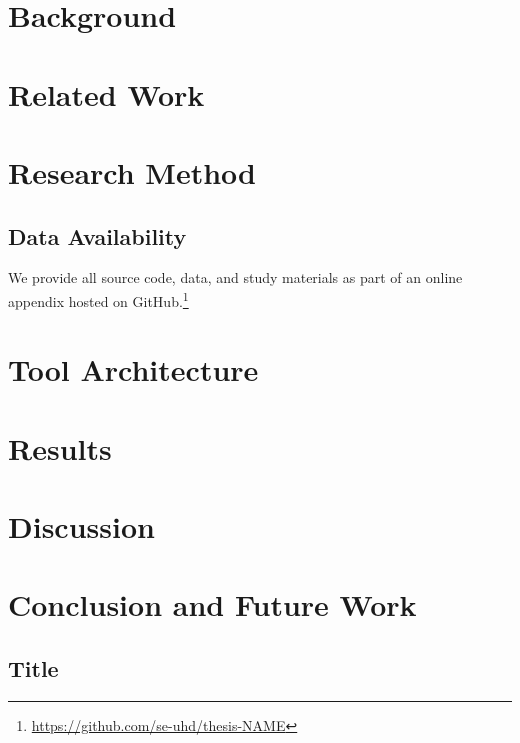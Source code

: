 \documentclass[
    pdftex,
    final,
    11pt,
    a4paper,
    parskip=false, %
    twoside, %
    footheight=0mm, %
    footinclude=false,
    toc=bibliography, %
    toc=listof %
]{scrbook} %
\begin{document}
\chapter{Background}
\label{ch:background}

\lipsum[1-12]

\chapter{Related Work}
\label{ch:related-work}

\lipsum[1-4]

\chapter{Research Method}
\label{ch:research-method}

\lipsum[1-4]

\section{Data Availability}
\label{sec:data-availability}

We provide all source code, data, and study materials as part of an online appendix hosted on GitHub.\footnote{\url{https://github.com/se-uhd/thesis-NAME}}


\chapter{Tool Architecture}
\label{ch:tool-architecture}

\lipsum[1-4]

\chapter{Results}
\label{ch:results}

\lipsum[1-4]

\chapter{Discussion}
\label{ch:discussion}

\lipsum[1-4]

\chapter{Conclusion and Future Work}
\label{ch:conclusion}

\lipsum[1-4]

\listoffigures
 
\listoftables




\begin{appendices}

\chapter{Title}

\end{appendices}

\backmatter
\end{document}
